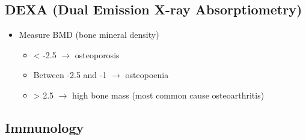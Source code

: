 \documentclass[
  12pt,
]{memoir}
\providecommand{\tightlist}{%
  \setlength{\itemsep}{0pt}\setlength{\parskip}{0pt}}
\begin{document}
\hypertarget{dexa-dual-emission-x-ray-absorptiometry}{%
\subsection{DEXA (Dual Emission X-ray
Absorptiometry)}\label{dexa-dual-emission-x-ray-absorptiometry}}

\begin{itemize}
\tightlist
\item
  Measure BMD (bone mineral density)

  \begin{itemize}
  \tightlist
  \item
    \textless{} -2.5 \(\rightarrow\) osteoporosis
  \item
    Between -2.5 and -1 \(\rightarrow\) osteopoenia
  \item
    \textgreater{} 2.5 \(\rightarrow\) high bone mass (most common cause
    osteoarthritis)
  \end{itemize}
\end{itemize}

\hypertarget{immunology}{%
\subsection{Immunology}\label{immunology}}
\end{document}
